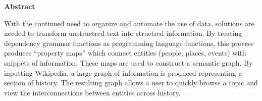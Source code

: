 %
%

\begin{center}

\bigskip

\begin{Large}
\textbf{\theTitle}
\end{Large}

\bigskip

\begin{large}
\theAuthor
\end{large}

\bigskip
\bigskip

\textbf{Abstract}

\end{center}

\noindent

With the continued need to organize and automate the use of data, solutions are needed to transform unstructred text into structred information.  By treating dependency grammar functions as programming language functions, this process produces ``property maps'' which connect entities (people, places, events) with snippets of information.  These maps are used to construct a semantic graph.  By inputting Wikipedia, a large graph of information is produced representing a section of history.  The resulting graph allows a user to quickly browse a topic and view the interconnections between entities across history.
